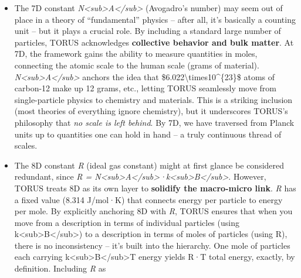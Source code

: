 \documentclass[]{article}
\begin{document}
{\begin{itemize}
  \emph{k\textless{}sub\textgreater{}B\textless{}/sub\textgreater{}}
  means that by this level, the recursion has accumulated enough degrees
  of freedom to talk about statistical ensembles and entropy. In TORUS,
  6D marks where a single particle's energy (set by 5D \emph{h} and some
  frequency) can be interpreted as thermal energy
  *k\textless{}sub\textgreater{}B\textless{}/sub\textgreater{}T in an
  ensemble. Thus,
  \emph{k\textless{}sub\textgreater{}B\textless{}/sub\textgreater{}}
  anchors the concept of temperature in the unified framework.
\item
  The 7D constant
  \emph{N\textless{}sub\textgreater{}A\textless{}/sub\textgreater{}}
  (Avogadro's number) may seem out of place in a theory of
  ``fundamental'' physics -- after all, it's basically a counting unit
  -- but it plays a crucial role. By including a standard large number
  of particles, TORUS acknowledges \textbf{collective behavior and bulk
  matter}. At 7D, the framework gains the ability to measure quantities
  in moles, connecting the atomic scale to the human scale (grams of
  material).
  \emph{N\textless{}sub\textgreater{}A\textless{}/sub\textgreater{}}
  anchors the idea that \$6.022\textbackslash{}times10\^{}\{23\}\$ atoms
  of carbon-12 make up 12 grams, etc., letting TORUS seamlessly move
  from single-particle physics to chemistry and materials. This is a
  striking inclusion (most theories of everything ignore chemistry), but
  it underscores TORUS's philosophy that \emph{no scale is left behind}.
  By 7D, we have traversed from Planck units up to quantities one can
  hold in hand -- a truly continuous thread of scales​.
\item
  The 8D constant \emph{R} (ideal gas constant) might at first glance be
  considered redundant, since \emph{R =
  N\textless{}sub\textgreater{}A\textless{}/sub\textgreater{}·k\textless{}sub\textgreater{}B\textless{}/sub\textgreater{}}.
  However, TORUS treats 8D as its own layer to \textbf{solidify the
  macro-micro link}. \emph{R} has a fixed value (8.314 J/mol·K) that
  connects energy per particle to energy per mole. By explicitly
  anchoring 8D with \emph{R}, TORUS ensures that when you move from a
  description in terms of individual particles (using
  k\textless{}sub\textgreater{}B\textless{}/sub\textgreater{}) to a
  description in terms of moles of particles (using R), there is no
  inconsistency -- it's built into the hierarchy. One mole of particles
  each carrying
  k\textless{}sub\textgreater{}B\textless{}/sub\textgreater{}T energy
  yields R·T total energy, exactly, by definition. Including \emph{R} as

\end{itemize}}
\end{document}
